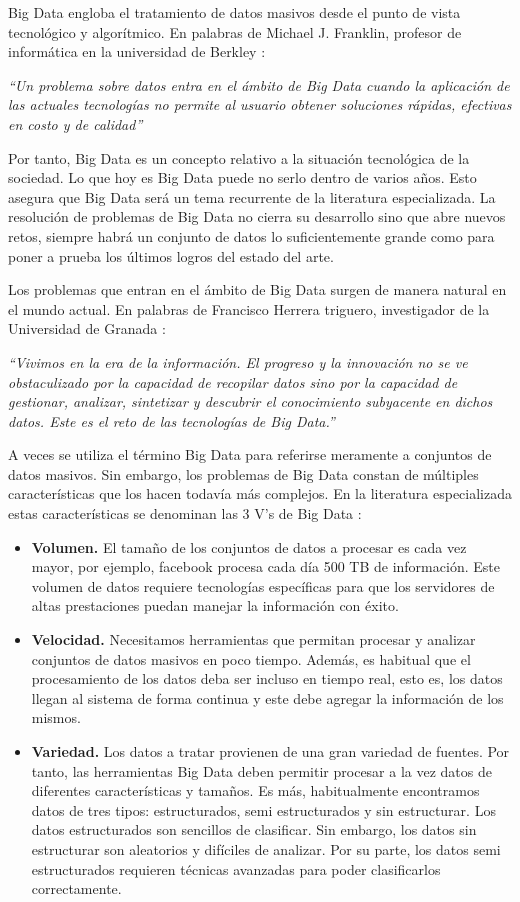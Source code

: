 \documentclass[10pt]{article}
\begin{document}
		Big Data engloba el tratamiento de datos masivos desde el punto de vista tecnológico y algorítmico. En palabras de Michael J. Franklin, profesor de informática en la universidad de Berkley \cite{bd-definition}:
		
		\textit{``Un problema sobre datos entra en el ámbito de Big Data cuando la aplicación de las actuales tecnologías no permite al usuario obtener soluciones  rápidas, efectivas en costo y de calidad''}
	
		Por tanto, Big Data es un concepto relativo a la situación tecnológica de la sociedad. Lo que hoy es Big Data puede no serlo dentro de varios años. Esto asegura que Big Data será un tema recurrente de la literatura especializada. La resolución de problemas de Big Data no cierra su desarrollo sino que abre nuevos retos, siempre habrá un conjunto de datos lo suficientemente grande como para poner a prueba los últimos logros del estado del arte.
	
		Los problemas que entran en el ámbito de Big Data surgen de manera natural en el mundo actual. En palabras de Francisco Herrera triguero, investigador de la Universidad de Granada  \cite{big-data-herrera}:
		
		\textit{``Vivimos en la era de la información. El progreso y la innovación no se ve obstaculizado por la capacidad de recopilar datos sino por la capacidad de gestionar, analizar, sintetizar y descubrir el conocimiento subyacente en dichos datos. Este es el reto de las tecnologías de Big Data.''}
		
		A veces se utiliza el término Big Data para referirse meramente a conjuntos de datos masivos. Sin embargo, los problemas de Big Data constan de múltiples características que los hacen todavía más complejos. En la literatura especializada estas características se denominan las 3 V's de Big Data \cite{big-data}:
	
		\begin{itemize}
			\item \textbf{Volumen.} El tamaño de los conjuntos de datos a procesar es cada vez mayor, por ejemplo, facebook procesa cada día 500 TB de información. Este volumen de datos requiere tecnologías específicas para que los servidores de altas prestaciones puedan manejar la información con éxito.
			\item \textbf{Velocidad.} Necesitamos herramientas que permitan procesar y analizar conjuntos de datos masivos en poco tiempo. Además, es habitual que el procesamiento de los datos deba ser incluso en tiempo real, esto es, los datos llegan al sistema de forma continua y este debe agregar la información de los mismos.
			\item \textbf{Variedad.} Los datos a tratar provienen de una gran variedad de fuentes. Por tanto, las herramientas Big Data deben permitir procesar a la vez datos de diferentes características y tamaños. Es más, habitualmente encontramos datos de tres tipos: estructurados, semi estructurados y sin estructurar. Los datos estructurados son sencillos de clasificar. Sin embargo, los datos sin estructurar son aleatorios y difíciles de analizar. Por su parte, los datos semi estructurados requieren técnicas avanzadas para poder clasificarlos correctamente.
		\end{itemize}
	
\end{document}
